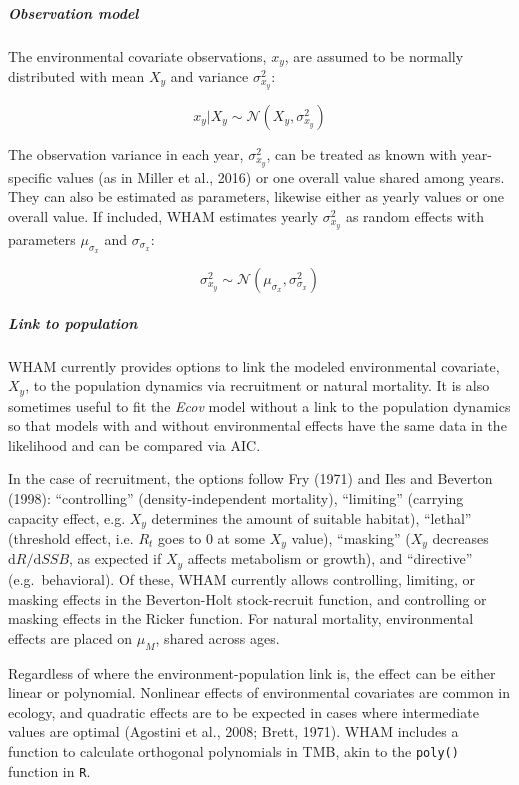 \documentclass[]{article}
\let\oldsubparagraph\subparagraph
\renewcommand{\subparagraph}[1]{\oldsubparagraph{#1}\mbox{}}
\begin{document}
\hypertarget{observation-model}{%
\subparagraph{Observation model}\label{observation-model}}

The environmental covariate observations, \(x_y\), are assumed to be
normally distributed with mean \(X_y\) and variance \(\sigma^2_{x_y}\):

\[x_y | X_y \sim \mathcal{N}\left( X_y, \sigma^2_{x_y} \right)\]

The observation variance in each year, \(\sigma^2_{x_y}\), can be
treated as known with year-specific values (as in Miller et al., 2016)
or one overall value shared among years. They can also be estimated as
parameters, likewise either as yearly values or one overall value. If
included, WHAM estimates yearly \(\sigma^2_{x_y}\) as random effects
with parameters \(\mu_{\sigma_x}\) and \(\sigma_{\sigma_x}\):

\[\sigma^2_{x_y} \sim \mathcal{N} \left( \mu_{\sigma_x}, \sigma^2_{\sigma_x} \right)\]

\hypertarget{link-to-population}{%
\subparagraph{Link to population}\label{link-to-population}}

WHAM currently provides options to link the modeled environmental
covariate, \(X_y\), to the population dynamics via recruitment or
natural mortality. It is also sometimes useful to fit the \emph{Ecov}
model without a link to the population dynamics so that models with and
without environmental effects have the same data in the likelihood and
can be compared via AIC.

In the case of recruitment, the options follow Fry (1971) and Iles and
Beverton (1998): ``controlling'' (density-independent mortality),
``limiting'' (carrying capacity effect, e.g. \(X_y\) determines the
amount of suitable habitat), ``lethal'' (threshold effect, i.e. \(R_t\)
goes to 0 at some \(X_y\) value), ``masking'' (\(X_y\) decreases
\(\text{d}R/\text{d}SSB\), as expected if \(X_y\) affects metabolism or
growth), and ``directive'' (e.g.~behavioral). Of these, WHAM currently
allows controlling, limiting, or masking effects in the Beverton-Holt
stock-recruit function, and controlling or masking effects in the Ricker
function. For natural mortality, environmental effects are placed on
\(\mu_M\), shared across ages.

Regardless of where the environment-population link is, the effect can
be either linear or polynomial. Nonlinear effects of environmental
covariates are common in ecology, and quadratic effects are to be
expected in cases where intermediate values are optimal (Agostini et
al., 2008; Brett, 1971). WHAM includes a function to calculate
orthogonal polynomials in TMB, akin to the \texttt{poly()} function in
\texttt{R}.
\end{document}
